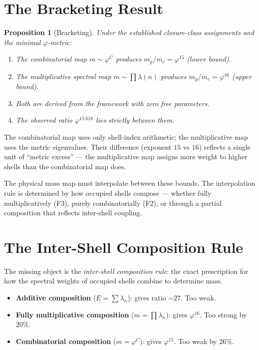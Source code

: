 \documentclass[12pt]{article}
\newtheorem{proposition}[theorem]{Proposition}
\newcommand{\phig}{\varphi}
\begin{document}
\section{The Bracketing Result}\label{sec:bracketing}

\begin{proposition}[Bracketing]\label{prop:bracket}
Under the established closure-class assignments and the minimal $\phig$-metric:
\begin{enumerate}
    \item The combinatorial map $m \sim \phig^C$ produces $m_p/m_e = \phig^{15}$ (lower bound).
    \item The multiplicative spectral map $m \sim \prod \lambda(n)$ produces $m_p/m_e = \phig^{16}$ (upper bound).
    \item Both are derived from the framework with zero free parameters.
    \item The observed ratio $\phig^{15.618}$ lies strictly between them.
\end{enumerate}
\end{proposition}

The combinatorial map uses only shell-index arithmetic; the multiplicative map uses the metric eigenvalues. Their difference (exponent $15$ vs $16$) reflects a single unit of ``metric excess'' --- the multiplicative map assigns more weight to higher shells than the combinatorial map does.

The physical mass map must interpolate between these bounds. The interpolation rule is determined by how occupied shells compose --- whether fully multiplicatively (F3), purely combinatorially (F2), or through a partial composition that reflects inter-shell coupling.

\section{The Inter-Shell Composition Rule}\label{sec:composition}

The missing object is the \textit{inter-shell composition rule}: the exact prescription for how the spectral weights of occupied shells combine to determine mass.

\begin{itemize}
    \item \textbf{Additive composition} ($E = \sum \lambda_n$): gives ratio $\sim\!27$. Too weak.
    \item \textbf{Fully multiplicative composition} ($m = \prod \lambda_n$): gives $\phig^{16}$. Too strong by $20\%$.
    \item \textbf{Combinatorial composition} ($m = \phig^C$): gives $\phig^{15}$. Too weak by $26\%$.
\end{itemize}
\end{document}

